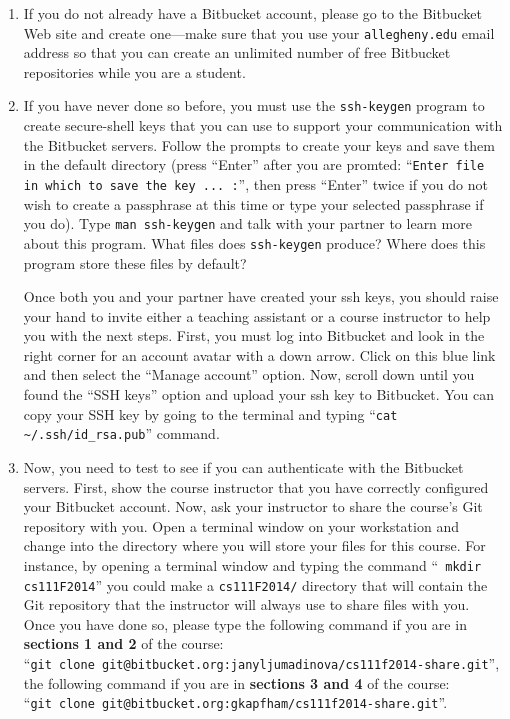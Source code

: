 \begin{enumerate}

  \item If you do not already have a Bitbucket account, please go to the Bitbucket Web site and create one---make sure
    that you use your {\tt allegheny.edu} email address so that you can create an unlimited number of free Bitbucket
    repositories while you are a student. 
    
  \item If you have never done so before, you must use the {\tt ssh-keygen} program to create secure-shell keys that you
    can use to support your communication with the Bitbucket servers. Follow the prompts to create your keys and save
    them in the default directory (press ``Enter'' after you are promted: ``{\tt Enter file in which to save the key ...
    :}'', then press ``Enter'' twice if you do not wish to create a passphrase at this time or type your selected
    passphrase if you do).   Type {\tt man ssh-keygen} and talk with your partner to learn more about this program.
    What files does {\tt ssh-keygen} produce?  Where does this program store these files by default?

    Once both you and your partner have created your ssh keys, you should raise your hand to invite either a teaching
    assistant or a course instructor to help you with the next steps. First, you must log into Bitbucket and look in the
    right corner for an account avatar with a down arrow.  Click on this blue link and then select the ``Manage
    account'' option. Now, scroll down until you found the ``SSH keys'' option and upload your ssh key to Bitbucket. You
    can copy your SSH key by going to the terminal and typing ``{\tt cat \textasciitilde{}/.ssh/id\_rsa.pub}'' command.

  \item Now, you need to test to see if you can authenticate with the Bitbucket servers.  First, show the course
    instructor that you have correctly configured your Bitbucket account.  Now, ask your instructor to share the
    course's Git repository with you.  Open a terminal window on your workstation and change into the directory where
    you will store your files for this course.  For instance, by opening a terminal window and typing the command ``{\tt
    mkdir cs111F2014}'' you could make a {\tt cs111F2014/} directory that will contain the Git repository that the
    instructor will always use to share files with you.  Once you have done so, please type the following command if you
    are in {\bf sections 1 and 2} of the course: \\ ``{\tt git clone
    git@bitbucket.org:janyljumadinova/cs111f2014-share.git}'',  the following command if you are in {\bf
    sections 3 and 4} of the course: \\``{\tt git clone git@bitbucket.org:gkapfham/cs111f2014-share.git}''.  


\end{enumerate}
